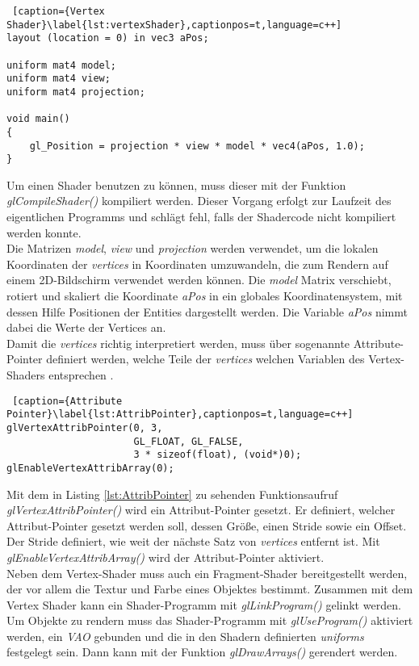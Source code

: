\documentclass[11pt,a4paper]{article}
\begin{document}
\begin{lstlisting} [caption={Vertex Shader}\label{lst:vertexShader},captionpos=t,language=c++]
layout (location = 0) in vec3 aPos;

uniform mat4 model;
uniform mat4 view;
uniform mat4 projection;

void main()
{
	gl_Position = projection * view * model * vec4(aPos, 1.0);
}
\end{lstlisting}
\noindent
Um einen Shader benutzen zu können, muss dieser mit der Funktion \mbox{\textit{glCompileShader()}} kompiliert werden. Dieser Vorgang erfolgt zur Laufzeit des eigentlichen Programms und schlägt fehl, falls der Shadercode nicht kompiliert werden konnte.\\
Die Matrizen \mbox{\textit{model}}, \mbox{\textit{view}} und \mbox{\textit{projection}} werden verwendet, um die lokalen Koordinaten der \mbox{\textit{vertices}} in Koordinaten umzuwandeln, die zum Rendern auf einem 2D-Bildschirm verwendet werden können. Die \mbox{\textit{model}} Matrix verschiebt, rotiert und skaliert die Koordinate \mbox{\textit{aPos}} in ein globales Koordinatensystem, mit dessen Hilfe Positionen der Entities dargestellt werden. Die Variable \mbox{\textit{aPos}} nimmt dabei die Werte der Vertices an.\\
Damit die \mbox{\textit{vertices}} richtig interpretiert werden, muss über sogenannte Attribute-Pointer definiert werden, welche Teile der \mbox{\textit{vertices}} welchen Variablen des Vertex-Shaders entsprechen \cite[Hello-Triangle]{LearnOpenGL}.

\begin{lstlisting} [caption={Attribute Pointer}\label{lst:AttribPointer},captionpos=t,language=c++]
glVertexAttribPointer(0, 3,
                      GL_FLOAT, GL_FALSE,
                      3 * sizeof(float), (void*)0);
glEnableVertexAttribArray(0);
\end{lstlisting}
\noindent
Mit dem in Listing \ref{lst:AttribPointer} zu sehenden Funktionsaufruf \mbox{\textit{glVertexAttribPointer()}} wird ein Attribut-Pointer gesetzt. Er definiert, welcher Attribut-Pointer gesetzt werden soll, dessen Größe, einen Stride sowie ein Offset. Der Stride definiert, wie weit der nächste Satz von \mbox{\textit{vertices}} entfernt ist. Mit \mbox{\textit{glEnableVertexAttribArray()}} wird der Attribut-Pointer aktiviert.\\
Neben dem Vertex-Shader muss auch ein Fragment-Shader bereitgestellt werden, der vor allem die Textur und Farbe eines Objektes bestimmt. Zusammen mit dem Vertex Shader kann ein Shader-Programm mit \mbox{\textit{glLinkProgram()}} gelinkt werden.\\
Um Objekte zu rendern muss das Shader-Programm mit \mbox{\textit{glUseProgram()}} aktiviert werden, ein \mbox{\textit{VAO}} gebunden und die in den Shadern definierten \mbox{\textit{uniforms}} festgelegt sein. Dann kann mit der Funktion \mbox{\textit{glDrawArrays()}} gerendert werden.
\end{document}
